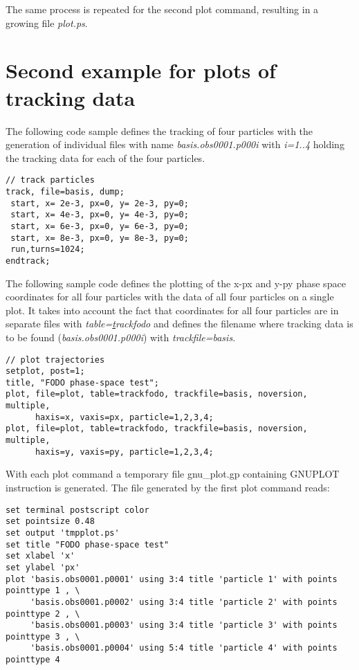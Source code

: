 The same process is repeated for the second plot command, resulting in a
growing file \textit{plot.ps}.


\section{Second example for plots of tracking data}
\label{sec:plot_example_2}

The following \madx code sample defines the tracking of four particles 
with the generation of individual files with name
\textit{basis.obs0001.p000i} with \textit{i=1..4}  
holding the tracking data for each of the four particles.  

\begin{verbatim}
// track particles
track, file=basis, dump;
 start, x= 2e-3, px=0, y= 2e-3, py=0;
 start, x= 4e-3, px=0, y= 4e-3, py=0;
 start, x= 6e-3, px=0, y= 6e-3, py=0;
 start, x= 8e-3, px=0, y= 8e-3, py=0;
 run,turns=1024;
endtrack;
\end{verbatim}

The following sample code defines the plotting of the x-px and y-py
phase space coordinates for all four particles with the data of all four
particles on a single plot.  
It takes into account the fact that coordinates for all four particles
are in separate files with 
\textit{table={\underline track}fodo} and defines the filename where tracking
data is to be found (\textit{basis.obs0001.p000i}) with
\textit{trackfile=basis}.  

\begin{verbatim}
// plot trajectories
setplot, post=1; 
title, "FODO phase-space test";
plot, file=plot, table=trackfodo, trackfile=basis, noversion, multiple, 
      haxis=x, vaxis=px, particle=1,2,3,4; 
plot, file=plot, table=trackfodo, trackfile=basis, noversion, multiple, 
      haxis=y, vaxis=py, particle=1,2,3,4;  
\end{verbatim}

With each plot command a temporary file gnu\_plot.gp containing GNUPLOT instruction is generated. 
The file generated by the first plot command reads: 

{\footnotesize \begin{verbatim}
set terminal postscript color
set pointsize 0.48
set output 'tmpplot.ps'
set title "FODO phase-space test"
set xlabel 'x'
set ylabel 'px'
plot 'basis.obs0001.p0001' using 3:4 title 'particle 1' with points pointtype 1 , \
     'basis.obs0001.p0002' using 3:4 title 'particle 2' with points pointtype 2 , \
     'basis.obs0001.p0003' using 3:4 title 'particle 3' with points pointtype 3 , \
     'basis.obs0001.p0004' using 5:4 title 'particle 4' with points pointtype 4 
\end{verbatim}}

